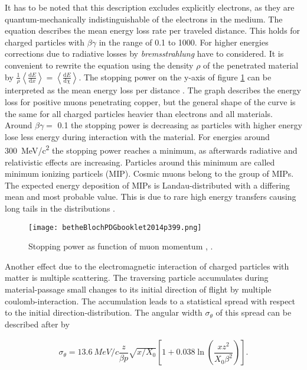 \documentclass[
twoside,            %
BCOR1.4cm,          %
10pt,               %
headings=normal,    %
headsepline,        %
clearplainpage,		%
final,              %
div=14,
open=right,
bibliography=toc
]{scrreprt}
\begin{document}
It has to be noted that this description excludes explicitly electrons, as they are quantum-mechanically indistinguishable of the electrons in the medium. 
The equation describes the mean energy loss rate per traveled distance.
This holds for charged particles with $\beta\gamma$ in the range of 0.1 to 1000.
For higher energies corrections due to radiative losses by \textit{bremsstrahlung} have to considered.
It is convenient to rewrite the equation using the density $\rho$ of the penetrated material by $\tfrac{1}{\rho}\left\langle\tfrac{\mathrm{d}E}{\mathrm{d}x}\right\rangle = \left\langle\tfrac{\mathrm{d}E}{\mathrm{d}\chi}\right\rangle$.
The stopping power on the y-axis of figure \ref{betheBloch} can be interpreted as the mean energy loss per distance \cite{PDG2014}.
The graph describes the energy loss for positive muons penetrating copper, but the general shape of the curve is the same for all charged particles heavier than electrons and all materials.
Around $\beta\gamma = $ 0.1 the stopping power is decreasing as particles with higher energy lose less energy during interaction with the material.
For energies around \SI{300}{MeV/c\squared} the stopping power reaches a minimum, as afterwards radiative and relativistic effects are increasing.
Particles around this minimum are called minimum ionizing particels (MIP).
Cosmic muons belong to the group of MIPs.
The expected energy deposition of MIPs is Landau-distributed with a differing mean and most probable value.
This is due to rare high energy transfers causing long tails in the distributions \cite{PDG2014}.

\begin{figure}[!h]
	\centering
	\texttt{[image: betheBlochPDGbooklet2014p399.png]}
	\vspace{-2mm}
	\caption{
		Stopping power as function of muon momentum
		\cite{PDG2014}, \cite{groomStopping}.
	}
	\label{betheBloch} 
\end{figure}

Another effect due to the electromagnetic interaction of charged particles with matter is multiple scattering.
The traversing particle accumulates during material-passage small changes to its initial direction of flight by multiple coulomb-interaction.
The accumulation leads to a statistical spread with respect to the initial direction-distribution.
The angular width $\sigma_\theta$ of this spread can be described after \cite{PDG2014} by 

\begin{align}
	\sigma_\theta = \SI{13.6}{MeV\per c} \dfrac{z}{\beta p} \sqrt{x/X_0} \left[ 1 + 0.038 \ln\left( \dfrac{x z^2}{X_0 \beta^2} \right) \right].
\end{align}
\end{document}
